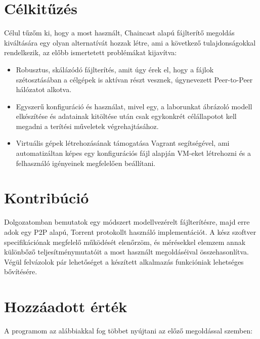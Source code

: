 \section{Célkitűzés}

Célul tűzőm ki, hogy a most használt, Chaincast alapú fájlterítő megoldás kiváltására egy olyan alternatívát hozzak létre, ami a következő tulajdonságokkal rendelkezik, az előbb ismertetett problémákat kijavítva:

\begin{itemize}
  \item Robusztus, skálázódó fájlterítés, amit úgy érek el, hogy a fájlok szétosztásában a célgépek is aktívan részt vesznek, úgynevezett Peer-to-Peer\cite{p2pdef} hálózatot alkotva.
  \item Egyszerű konfiguráció és használat, mivel egy, a laborunkat ábrázoló modell elkészítése és adatainak kitöltése után csak egykonkrét célállapotot kell megadni a terítési műveletek végrehajtásához.
  \item Virtuális gépek létrehozásának támogatása Vagrant\cite{vagrant} segítségével, ami automatizáltan képes egy konfigurációs fájl alapján VM-eket létrehozni és a felhasználó igényeinek megfelelően beállítani.
\end{itemize}

\section{Kontribúció}
Dolgozatomban bemutatok egy módszert modellvezérelt fájlterítésre, majd erre adok egy P2P alapú, Torrent protokollt használó implementációt. A kész szoftver specifikációnak megfelelő működését elenőrzöm, és mérésekkel elemzem annak különbőző teljesítménymutatóit a most használt megoldáséival összehasonlítva. Végül felvázolok pár lehetőséget a készített alkalmazás funkcióniak lehetséges bővítésére.

\section{Hozzáadott érték}
A programom az alábbiakkal fog többet nyújtani az előző megoldással szemben:

